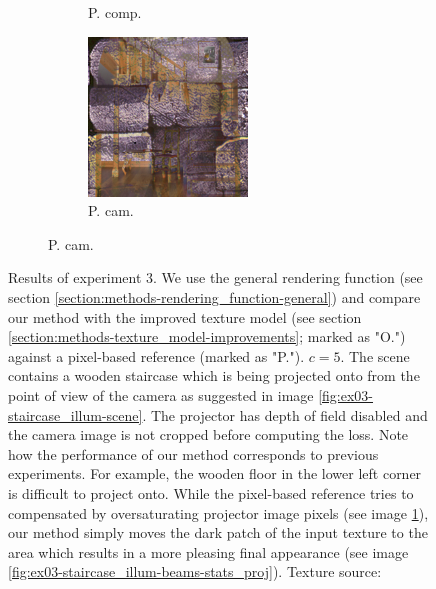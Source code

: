 \begin{figure}[]
\begin{subfigure}{\textwidth}
\begin{subfigure}{0.19\textwidth}
            \caption{P. comp.}
            \label{fig:ex03-staircase_illum-beams-pixel_im}
        \end{subfigure}
        \hfill
        \begin{subfigure}{0.19\textwidth}
            \centering
            \includegraphics[width=\textwidth]{images/04-experiment03/staircase_illum/beams/pixel_proj.jpg}
            \caption{P. cam.}
            \label{fig:ex03-staircase_illum-beams-pixel_proj}
        \end{subfigure}
    \end{subfigure}
    \caption{Results of experiment 3. We use the general rendering function (see section  \ref{section:methods-rendering_function-general}) and compare our method with the improved texture model (see section \ref{section:methods-texture_model-improvements}; marked as "O.") against a pixel-based reference (marked as "P."). \(c = 5\). The scene contains a wooden staircase which is being projected onto from the point of view of the camera as suggested in image \ref{fig:ex03-staircase_illum-scene}. The projector has depth of field disabled and the camera image is not cropped before computing the loss. Note how the performance of our method corresponds to previous experiments. For example, the wooden floor in the lower left corner is difficult to project onto. While the pixel-based reference tries to compensated by oversaturating projector image pixels (see image \ref{fig:ex03-staircase_illum-beams-pixel_im}), our method simply moves the dark patch of the input texture to the area which results in a more pleasing final appearance (see image \ref{fig:ex03-staircase_illum-beams-stats_proj}). Texture source: \citet{Pixar128}}
    \label{fig:ex03-staircase_illum}
\end{figure}

